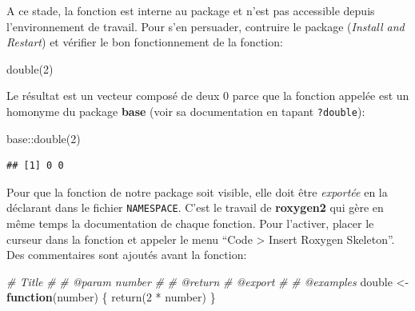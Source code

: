 \documentclass[
  11pt,
  french,
  a4paper,
  extrafontsizes,onecolumn,openright
  ]{memoir}
\newenvironment{Shaded}{\begin{snugshade}}{\end{snugshade}}
\newcommand{\CommentTok}[1]{\textcolor[rgb]{0.56,0.35,0.01}{\textit{#1}}}
\newcommand{\ControlFlowTok}[1]{\textcolor[rgb]{0.13,0.29,0.53}{\textbf{#1}}}
\newcommand{\DecValTok}[1]{\textcolor[rgb]{0.00,0.00,0.81}{#1}}
\newcommand{\FunctionTok}[1]{\textcolor[rgb]{0.00,0.00,0.00}{#1}}
\newcommand{\NormalTok}[1]{#1}
\newcommand{\OtherTok}[1]{\textcolor[rgb]{0.56,0.35,0.01}{#1}}
\newcommand{\SpecialCharTok}[1]{\textcolor[rgb]{0.00,0.00,0.00}{#1}}
\begin{document}
\normalsize

A ce stade, la fonction est interne au package et n'est pas accessible depuis l'environnement de travail.
Pour s'en persuader, contruire le package (\emph{Install and Restart}) et vérifier le bon fonctionnement de la fonction:

\scriptsize

\begin{Shaded}
\begin{Highlighting}[]
\FunctionTok{double}\NormalTok{(}\DecValTok{2}\NormalTok{)}
\end{Highlighting}
\end{Shaded}

\normalsize

Le résultat est un vecteur composé de deux 0 parce que la fonction appelée est un homonyme du package \textbf{base} (voir sa documentation en tapant \texttt{?double}):

\scriptsize

\begin{Shaded}
\begin{Highlighting}[]
\NormalTok{base}\SpecialCharTok{::}\FunctionTok{double}\NormalTok{(}\DecValTok{2}\NormalTok{)}
\end{Highlighting}
\end{Shaded}

\begin{verbatim}
## [1] 0 0
\end{verbatim}

\normalsize

Pour que la fonction de notre package soit visible, elle doit être \emph{exportée} en la déclarant dans le fichier \texttt{NAMESPACE}.
C'est le travail de \textbf{roxygen2} qui gère en même temps la documentation de chaque fonction.
Pour l'activer, placer le curseur dans la fonction et appeler le menu ``Code \textgreater{} Insert Roxygen Skeleton''.
Des commentaires sont ajoutés avant la fonction:

\scriptsize

\begin{Shaded}
\begin{Highlighting}[]
\CommentTok{\#\textquotesingle{} Title}
\CommentTok{\#\textquotesingle{}}
\CommentTok{\#\textquotesingle{} @param number }
\CommentTok{\#\textquotesingle{}}
\CommentTok{\#\textquotesingle{} @return}
\CommentTok{\#\textquotesingle{} @export}
\CommentTok{\#\textquotesingle{}}
\CommentTok{\#\textquotesingle{} @examples}
\NormalTok{double }\OtherTok{\textless{}{-}} \ControlFlowTok{function}\NormalTok{(number) \{}
    \FunctionTok{return}\NormalTok{(}\DecValTok{2} \SpecialCharTok{*}\NormalTok{ number)}
\NormalTok{\}}
\end{Highlighting}
\end{Shaded}
\end{document}
